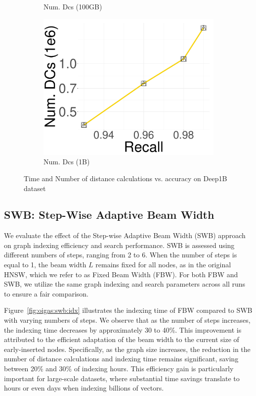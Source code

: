 \begin{figure}[htbp]
\begin{subfigure}[b]{0.28\textwidth}
        \caption{Num. Dcs (100GB)}
        \label{fig:SPQ:100GB_DC}
    \end{subfigure}
    \hspace{0.4cm}
    \begin{subfigure}[b]{0.28\textwidth}
        \captionsetup{justification=centering}
	\centering	
        \includegraphics[width=\textwidth]{../img/oigas/PQVSPQS/1B/deep_10_DC.pdf}
        \caption{Num. Dcs (1B)}
        \label{fig:SPQ:1B_DC}
    \end{subfigure}
    \caption{Time and Number of distance calculations vs. accuracy on Deep1B dataset}
    \label{fig:hnswnew_time_and_dc}
\end{figure}

\subsection{SWB: Step-Wise Adaptive Beam Width}

We evaluate the effect of the Step-wise Adaptive Beam Width (SWB) approach on graph indexing efficiency and search performance. SWB is assessed using different numbers of steps, ranging from 2 to 6. When the number of steps is equal to 1, the beam width \( L \) remains fixed for all nodes, as in the original HNSW, which we refer to as Fixed Beam Width (FBW). For both FBW and SWB, we utilize the same graph indexing and search parameters across all runs to ensure a fair comparison.

 Figure~\ref{fig:oigas:swb:idx} illustrates the indexing time of FBW compared to SWB with varying numbers of steps. We observe that as the number of steps increases, the indexing time decreases by approximately 30 to 40\%. This improvement is attributed to the efficient adaptation of the beam width to the current size of early-inserted nodes. Specifically, as the graph size increases, the reduction in the number of distance calculations and indexing time remains significant, saving between 20\% and 30\% of indexing hours. This efficiency gain is particularly important for large-scale datasets, where substantial time savings translate to hours or even days when indexing billions of vectors.



